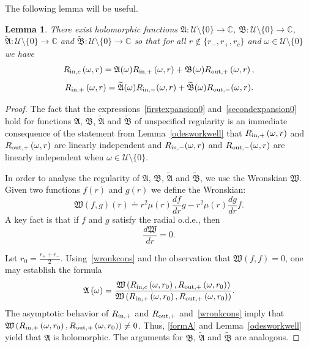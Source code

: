\documentclass[A4,10pt]{article}
\newtheorem{lemma}{Lemma}[subsection]
\begin{document}
The following lemma will be useful.
\begin{lemma}\label{analyticcoefficients}There exist holomorphic functions $\mathfrak{A} : \mathcal{U}\setminus\{0\} \to \mathbb{C}$, $\mathfrak B: \mathcal{U}\setminus\{0\} \to \mathbb{C}$, $\widetilde{\mathfrak{A}}:\mathcal{U}\setminus\{0\} \to \mathbb{C}$ and $\mathfrak{\widetilde B}:\mathcal{U}\setminus\{0\}\to \mathbb{C}$ so that for all $r \not\in \{r_-,r_+,r_c\}$ and $\omega \in \mathcal{U}\setminus\{0\}$ we have
\begin{equation}\label{firstexpansion0}
R_{{\rm in},c}\left(\omega,r\right) = \mathfrak{A}(\omega)R_{{\rm in},+}\left(\omega,r\right) + \mathfrak{B}(\omega)R_{{\rm out},+}\left(\omega,r\right),
\end{equation}
\begin{equation}\label{secondexpansion0}
R_{{\rm in},+}\left(\omega,r\right) = \mathfrak{\widetilde A}(\omega) R_{{\rm in},-}(\omega,r) +\mathfrak{ \widetilde B}(\omega) R_{{\rm out},-}(\omega,r).
\end{equation}
\end{lemma}
\begin{proof}The fact that the expressions~\eqref{firstexpansion0} and~\eqref{secondexpansion0} hold for functions $\mathfrak A$, $\mathfrak B$, $\mathfrak{\widetilde A}$ and $\mathfrak{\widetilde B}$ of unspecified regularity is an immediate consequence of the statement from Lemma~\ref{odesworkwell} that $R_{{\rm in},+}\left(\omega,r\right)$ and $R_{{\rm out},+}\left(\omega,r\right)$ are linearly independent and  $R_{{\rm in},-}(\omega,r)$ and  $R_{{\rm out},-}(\omega,r)$ are linearly independent when $\omega \in \mathcal{U}\setminus\{0\}$.

In order to analyse the regularity of $\mathfrak{A}$, $\mathfrak B$, $\mathfrak{\widetilde A}$ and $\mathfrak{\widetilde B}$, we use the Wronskian $\mathfrak W$. Given two functions $f(r)$ and $g(r)$ we define the Wronskian:
\[\mathfrak W\left(f,g\right)(r) \doteq r^2\mu(r)\frac{df}{dr}g - r^2\mu(r)\frac{dg}{dr}f.\]
A key fact is that if $f$ and $g$ satisfy the radial o.d.e., then
\begin{equation}\label{wronkcons}
\frac{d\mathfrak W}{dr} = 0.
\end{equation}

Let $r_0 = \frac{r_++r_-}{2}$. Using~\eqref{wronkcons} and the observation that $\mathfrak W\left(f,f\right) = 0$, one may establish the formula
\begin{equation}\label{formA}
\mathfrak A\left(\omega\right) = \frac{\mathfrak W\left(R_{{\rm in},c}\left(\omega,r_0\right),R_{{\rm out},+}\left(\omega,r_0\right)\right)}{\mathfrak W\left(R_{{\rm in},+}\left(\omega,r_0\right),R_{{\rm out},+}\left(\omega,r_0\right)\right)}.
\end{equation}
The asymptotic behavior of $R_{{\rm in},+}$ and $R_{{\rm out},+}$ and~\eqref{wronkcons} imply that $\mathfrak W\left(R_{{\rm in},+}\left(\omega,r_0\right),R_{{\rm out},+}\left(\omega,r_0\right)\right)\ne0$. Thus, \eqref{formA} and Lemma~\ref{odesworkwell} yield that $\mathfrak A$ is 
holomorphic. The arguments for $\mathfrak B$, $\mathfrak{\widetilde A}$ and $\mathfrak{\widetilde B}$ are analogous. 
\end{proof}
\end{document}

